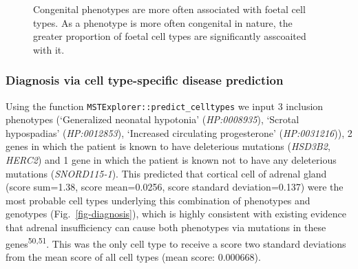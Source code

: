 \documentclass[
sn-nature
]{sn-jnl}
\begin{document}
\label{cell-fig-congenital}
\begin{figure}[H]


\caption{\label{fig-congenital}Congenital phenotypes are more often
associated with foetal cell types. As a phenotype is more often
congenital in nature, the greater proportion of foetal cell types are
significantly asscoaited with it.}

\end{figure}%

\subsubsection{Diagnosis via cell type-specific disease
prediction}\label{diagnosis-via-cell-type-specific-disease-prediction}

Using the function \texttt{MSTExplorer::predict\_celltypes} we input 3
inclusion phenotypes (`Generalized neonatal hypotonia'
(\emph{HP:0008935}), `Scrotal hypospadias' (\emph{HP:0012853}),
`Increased circulating progesterone' (\emph{HP:0031216})), 2 genes in
which the patient is known to have deleterious mutations (\emph{HSD3B2},
\emph{HERC2}) and 1 gene in which the patient is known not to have any
deleterious mutations (\emph{SNORD115-1}). This predicted that cortical
cell of adrenal gland (score sum=1.38, score mean=0.0256, score standard
deviation=0.137) were the most probable cell types underlying this
combination of phenotypes and genotypes (Fig.~\ref{fig-diagnosis}),
which is highly consistent with existing evidence that adrenal
insufficiency can cause both phenotypes via mutations in these
genes\textsuperscript{50,51}. This was the only cell type to receive a
score two standard deviations from the mean score of all cell types
(mean score: 0.000668).
\end{document}
